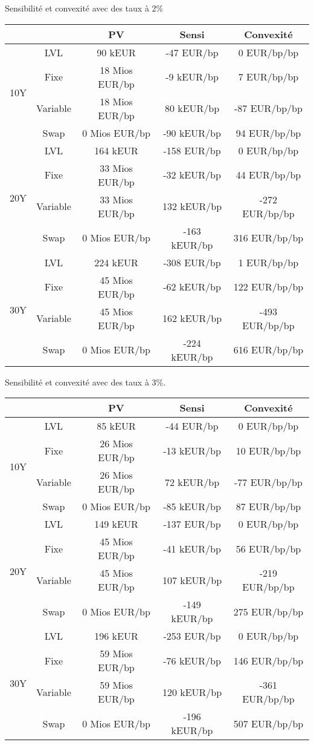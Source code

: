 \documentclass{beamer}
\begin{document}
\begin{frame}{Sensibilité et convexité avec des taux à 2\%}
\small
\begin{tabular}{|c|c|c|c|c|}
\hline
&&PV&Sensi&Convexité  \\ 
\hline
\multirow{4}{*}{10Y}&LVL& 90 kEUR &  -47 EUR/bp & 0 EUR/bp/bp \\ 
&Fixe& 18 Mios EUR/bp &  -9 kEUR/bp & 7 EUR/bp/bp \\ 
&Variable& 18 Mios EUR/bp & 80 kEUR/bp & -87 EUR/bp/bp \\ 
&Swap& 0 Mios EUR/bp & -90 kEUR/bp & 94 EUR/bp/bp \\ 
\hline
\multirow{4}{*}{20Y}&LVL& 164 kEUR &  -158 EUR/bp & 0 EUR/bp/bp \\ 
&Fixe& 33 Mios EUR/bp &  -32 kEUR/bp & 44 EUR/bp/bp \\ 
&Variable& 33 Mios EUR/bp & 132 kEUR/bp & -272 EUR/bp/bp \\ 
&Swap& 0 Mios EUR/bp & -163 kEUR/bp & 316 EUR/bp/bp \\ 
\hline
\multirow{4}{*}{30Y}&LVL& 224 kEUR &  -308 EUR/bp & 1 EUR/bp/bp \\ 
&Fixe& 45 Mios EUR/bp &  -62 kEUR/bp & 122 EUR/bp/bp \\ 
&Variable& 45 Mios EUR/bp & 162 kEUR/bp & -493 EUR/bp/bp \\ 
&Swap& 0 Mios EUR/bp & -224 kEUR/bp & 616 EUR/bp/bp \\ 
\hline
\end{tabular}
\normalsize
\end{frame}

\begin{frame}{Sensibilité et convexité avec des taux  à 3\%.}
\small 
\begin{tabular}{|c|c|c|c|c|}
\hline
&&PV&Sensi&Convexité  \\ 
\hline
\multirow{4}{*}{10Y}&LVL& 85 kEUR &  -44 EUR/bp & 0 EUR/bp/bp \\ 
&Fixe& 26 Mios EUR/bp &  -13 kEUR/bp & 10 EUR/bp/bp \\ 
&Variable& 26 Mios EUR/bp & 72 kEUR/bp & -77 EUR/bp/bp \\ 
&Swap& 0 Mios EUR/bp & -85 kEUR/bp & 87 EUR/bp/bp \\ 
\hline
\multirow{4}{*}{20Y}&LVL& 149 kEUR &  -137 EUR/bp & 0 EUR/bp/bp \\ 
&Fixe& 45 Mios EUR/bp &  -41 kEUR/bp & 56 EUR/bp/bp \\ 
&Variable& 45 Mios EUR/bp & 107 kEUR/bp & -219 EUR/bp/bp \\ 
&Swap& 0 Mios EUR/bp & -149 kEUR/bp & 275 EUR/bp/bp \\ 
\hline
\multirow{4}{*}{30Y}&LVL& 196 kEUR &  -253 EUR/bp & 0 EUR/bp/bp \\ 
&Fixe& 59 Mios EUR/bp &  -76 kEUR/bp & 146 EUR/bp/bp \\ 
&Variable& 59 Mios EUR/bp & 120 kEUR/bp & -361 EUR/bp/bp \\ 
&Swap& 0 Mios EUR/bp & -196 kEUR/bp & 507 EUR/bp/bp \\ 
\hline
\end{tabular}
\normalsize
\end{frame}
\end{document}

